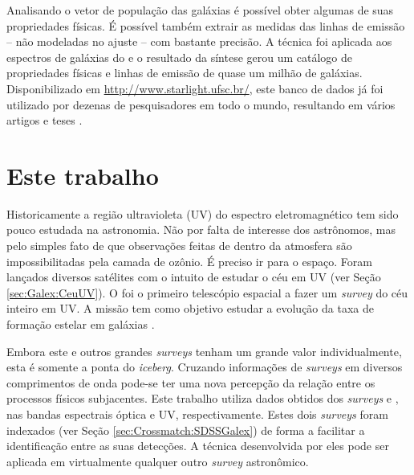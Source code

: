 Analisando o vetor de população das galáxias é possível obter algumas de suas
propriedades físicas. É possível também extrair as medidas das linhas de emissão
-- não modeladas no ajuste -- com bastante precisão. A técnica foi aplicada aos
espectros de galáxias do \SDSS e o resultado da síntese gerou um catálogo de
propriedades físicas e linhas de emissão de quase um milhão de galáxias.
Disponibilizado em \url{http://www.starlight.ufsc.br/}, este banco de dados já
foi utilizado por dezenas de pesquisadores em todo o mundo, resultando em vários
artigos \citep{Bla, Bla1, Bla2} e teses \citep{Ble, Ble1, Ble2}.\fixme



\section{Este trabalho}
\label{sec:Intro:EsteTrab}

Historicamente a região ultravioleta (UV) do espectro eletromagnético tem sido
pouco estudada na astronomia. Não por falta de interesse dos astrônomos, mas
pelo simples fato de que observações feitas de dentro da atmosfera são
impossibilitadas pela camada de ozônio. É preciso ir para o espaço. Foram
lançados diversos satélites com o intuito de estudar o céu em UV (ver Seção
\ref{sec:Galex:CeuUV}). O \galex foi o primeiro telescópio espacial a fazer um
{\em survey} do céu inteiro em UV. A missão tem como objetivo estudar a evolução
da taxa de formação estelar em galáxias \citep{Martin2005}.

Embora este e outros grandes {\em surveys} tenham um grande valor
individualmente, esta é somente a ponta do {\em iceberg}. Cruzando informações
de {\em surveys} em diversos comprimentos de onda pode-se ter uma nova percepção
da relação entre os processos físicos subjacentes. Este trabalho utiliza dados
obtidos dos {\em surveys} \SDSS e \galex, nas bandas espectrais óptica e UV,
respectivamente. Estes dois {\em surveys} foram indexados (ver Seção
\ref{sec:Crossmatch:SDSSGalex}) de forma a facilitar a identificação entre as
suas detecções. A técnica desenvolvida por eles pode ser aplicada em
virtualmente qualquer outro {\em survey} astronômico.


